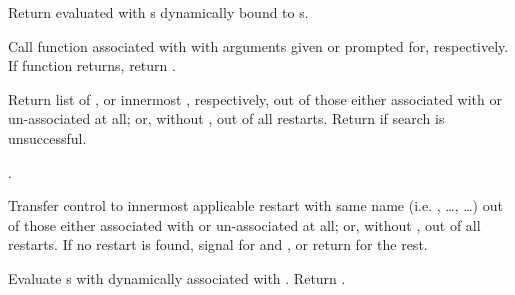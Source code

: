 \begin{LIST}{1cm}
  {
  Return  evaluated with s 
  dynamically bound to s.
  }

  {
  Call function associated with  with arguments given or
  prompted for, respectively. If  function returns, return .
  }

  {
  Return list of , or innermost 
  , respectively, out of those either associated
  with  or un-associated at all; or, without
  , out of all restarts. Return \retval{\NIL} if search
  is unsuccessful.
  }

  {
  .
  }

  {
  Transfer control to innermost applicable restart with same name
  (i.e. , \ldots,  \ldots) out of those either associated
  with  or un-associated at all; or, without
  , out of all restarts. If no restart is found,
  signal  for  and ,
  or return \retval{\NIL} for the rest.
  }

  {
  Evaluate s with 
  dynamically associated with . Return . 
  }


\end{LIST}
